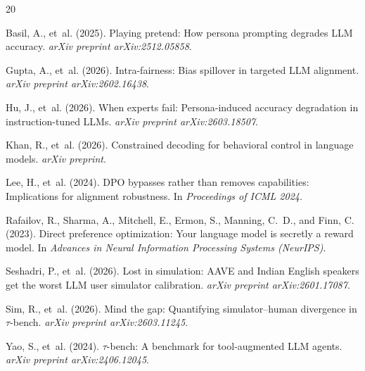 \documentclass[11pt]{article}
\begin{document}
\begin{thebibliography}{20}

Basil, A., et~al. (2025).
\newblock Playing pretend: How persona prompting degrades LLM accuracy.
\newblock \emph{arXiv preprint arXiv:2512.05858}.

Gupta, A., et~al. (2026).
\newblock Intra-fairness: Bias spillover in targeted LLM alignment.
\newblock \emph{arXiv preprint arXiv:2602.16438}.

Hu, J., et~al. (2026).
\newblock When experts fail: Persona-induced accuracy degradation in instruction-tuned LLMs.
\newblock \emph{arXiv preprint arXiv:2603.18507}.

Khan, R., et~al. (2026).
\newblock Constrained decoding for behavioral control in language models.
\newblock \emph{arXiv preprint}.

Lee, H., et~al. (2024).
\newblock DPO bypasses rather than removes capabilities: Implications for alignment robustness.
\newblock In \emph{Proceedings of ICML 2024}.

Rafailov, R., Sharma, A., Mitchell, E., Ermon, S., Manning, C.~D., and Finn, C. (2023).
\newblock Direct preference optimization: Your language model is secretly a reward model.
\newblock In \emph{Advances in Neural Information Processing Systems (NeurIPS)}.

Seshadri, P., et~al. (2026).
\newblock Lost in simulation: AAVE and Indian English speakers get the worst LLM user simulator calibration.
\newblock \emph{arXiv preprint arXiv:2601.17087}.

Sim, R., et~al. (2026).
\newblock Mind the gap: Quantifying simulator--human divergence in $\tau$-bench.
\newblock \emph{arXiv preprint arXiv:2603.11245}.

Yao, S., et~al. (2024).
\newblock $\tau$-bench: A benchmark for tool-augmented LLM agents.
\newblock \emph{arXiv preprint arXiv:2406.12045}.

\end{thebibliography}
\end{document}
